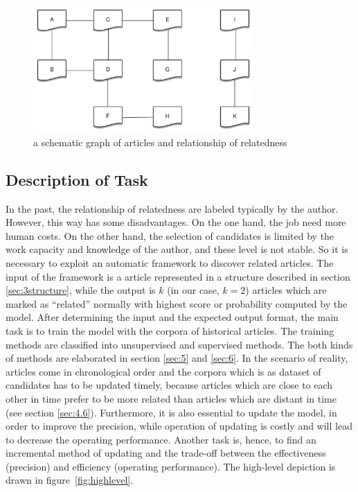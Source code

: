 \begin{figure}[!htb]
    \centering
    \includegraphics[width=0.75\textwidth]{fig/relatedness.pdf}
    \caption{a schematic graph of articles and relationship of relatedness}
    \label{fig:relatedness}
\end{figure}


\subsection{Description of Task}
\label{sec:3.2}

In the past, the relationship of relatedness are labeled typically by the author. However, this way has some disadvantages. On the one hand, the job need more human costs. On the other hand, the selection of candidates is limited by the work capacity and knowledge of the author, and these level is not stable. So it is necessary to exploit an automatic framework to discover related articles. The input of the framework is a article represented in a structure described in section \ref{sec:3structure}, while the output is $k$ (in our case, $k=2$) articles which are marked as ``related'' normally with highest score or probability computed by the model. After determining the input and the expected output format, the main task is to train the model with the corpora of historical articles. The training methods are classified into unsupervised and supervised methods. The both kinds of methods are elaborated in section \ref{sec:5} and \ref{sec:6}. In the scenario of reality, articles come in chronological order and the corpora which is as dataset of candidates has to be updated timely, because articles which are close to each other in time prefer to be more related than articles which are distant in time (see section \ref{sec:4.6}). Furthermore, it is also essential to update the model, in order to improve the precision, while operation of updating is costly and will lead to decrease the operating performance. Another task is, hence, to find an incremental method of updating and the trade-off between the effectiveness (precision) and efficiency (operating performance). The high-level depiction is drawn in figure~\ref{fig:highlevel}. 

